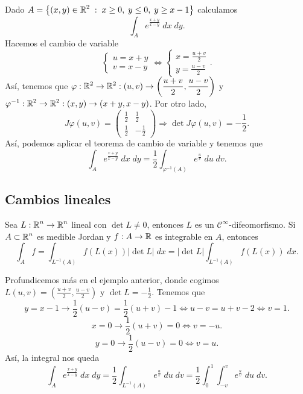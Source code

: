 \begin{eg}
	Dado $\displaystyle A = \left\{ \left(x,y\right) \in \mathbb{R}^{2} \; : \; x\geq 0,\; y \leq 0, \; y \geq x - 1\right\}  $ calculamos
	\[\int _{A}e^{\frac{x+y}{x-y}} \; dx \; dy .\]
	Hacemos el cambio de variable 
	\[
	\begin{cases}
	u = x + y \\
	v = x-y
	\end{cases}
	\iff 
\begin{cases}
x = \frac{u + v}{2} \\
y = \frac{u-v}{2}
\end{cases}
.\]
Así, tenemos que $\displaystyle \varphi : \mathbb{R}^{2}\to \mathbb{R}^{2} : \left(u,v\right) \to \left(\frac{u+v}{2}, \frac{u-v}{2}\right) $ y $\displaystyle \varphi^{-1} : \mathbb{R}^{2} \to \mathbb{R}^{2} : \left(x,y\right) \to \left(x+y, x-y\right) $. Por otro lado,
\[J\varphi\left(u,v\right) = \begin{pmatrix} \frac{1}{2} & \frac{1}{2} \\ \frac{1}{2} & - \frac{1}{2} \end{pmatrix} \Rightarrow \det J\varphi\left(u,v\right)=-\frac{1}{2} .\]
Así, podemos aplicar el teorema de cambio de variable y tenemos que 
\[\int _{A}e^{\frac{x+y}{x-y}} \; dx \; dy = \frac{1}{2}\int _{\varphi^{-1}\left(A\right)}e^{\frac{u}{v}} \; du \; dv .\]

\end{eg}
\subsection{Cambios lineales}
Sea $\displaystyle L : \mathbb{R}^{n}\to \mathbb{R}^{n} $ lineal con $\displaystyle \det L \neq 0 $, entonces $\displaystyle L  $ es un $\displaystyle \mathcal{C}^{\infty} $-difeomorfismo. Si $\displaystyle A \subset \mathbb{R}^{n} $ es medible Jordan y $\displaystyle f : A \to \mathbb{R} $ es integrable en $\displaystyle A $, entonces 
\[\int _{A}f =\int _{L^{-1}\left(A\right)}f\left(L\left(x\right)\right) \left|\det L\right| \; dx = \left|\det L\right|\int _{L^{-1}\left(A\right)}f\left(L\left(x\right)\right) \; dx .\]
\begin{eg}
Profundicemos más en el ejemplo anterior, donde cogimos $\displaystyle L\left(u,v\right)=\left(\frac{u+v}{2}, \frac{u-v}{2}\right) $ y $\displaystyle \det L = - \frac{1}{2} $. Tenemos que 
\[y = x-1 \rightarrow \frac{1}{2}\left(u-v\right)=\frac{1}{2}\left(u+v\right)-1\iff u - v=u + v-2 \iff v = 1 .\]
\[x = 0 \rightarrow \frac{1}{2}\left(u+v\right)=0 \iff v = -u.\]
\[y = 0 \rightarrow \frac{1}{2}\left(u-v\right)=0 \iff v = u .\]
Así, la integral nos queda
\[\int _{A}e^{\frac{x+y}{x-y}} \; dx \; dy = \frac{1}{2}\int _{L^{-1}\left(A\right)}e^{\frac{u}{v}} \; du \; dv = \frac{1}{2}\int^{1}_{0} \int^{v}_{-v} e^{\frac{u}{v}} \; du \; dv .\]
\end{eg}
